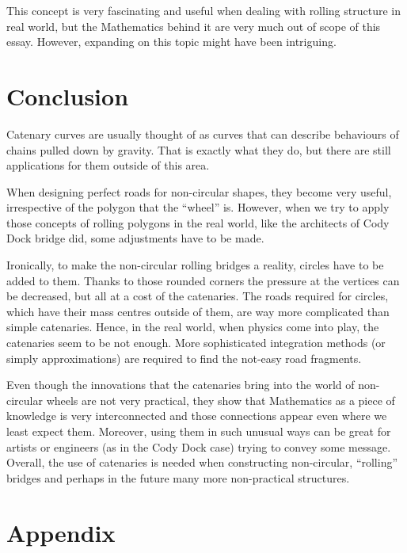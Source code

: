 \documentclass[12pt]{article}
\begin{document}
        This concept is very fascinating and useful when dealing with rolling structure in real world, but the Mathematics behind it are very much out of scope of this essay. However, expanding on this topic might have been intriguing.

    \section{Conclusion}

        Catenary curves are usually thought of as curves that can describe behaviours of chains pulled down by gravity. That is exactly what they do, but there are still applications for them outside of this area.

        When designing perfect roads for non-circular shapes, they become very useful, irrespective of the polygon that the ``wheel'' is. However, when we try to apply those concepts of rolling polygons in the real world, like the architects of Cody Dock bridge did, some adjustments have to be made.

        Ironically, to make the non-circular rolling bridges a reality, circles have to be added to them. Thanks to those rounded corners the pressure at the vertices can be decreased, but all at a cost of the catenaries. The roads required for circles, which have their mass centres outside of them, are way more complicated than simple catenaries. Hence, in the real world, when physics come into play, the catenaries seem to be not enough. More sophisticated integration methods (or simply approximations) are required to find the not-easy road fragments.

        Even though the innovations that the catenaries bring into the world of non-circular wheels are not very practical, they show that Mathematics as a piece of knowledge is very interconnected and those connections appear even where we least expect them. Moreover, using them in such unusual ways can be great for artists or engineers (as in the Cody Dock case) trying to convey some message. Overall, the use of catenaries is needed when constructing non-circular, ``rolling'' bridges and perhaps in the future many more non-practical structures.

    \newpage
    
    

    \newpage
    \section*{Appendix}
    \appendix
    \renewcommand{\thesubsection}{\Alph{subsection}}
\end{document}
